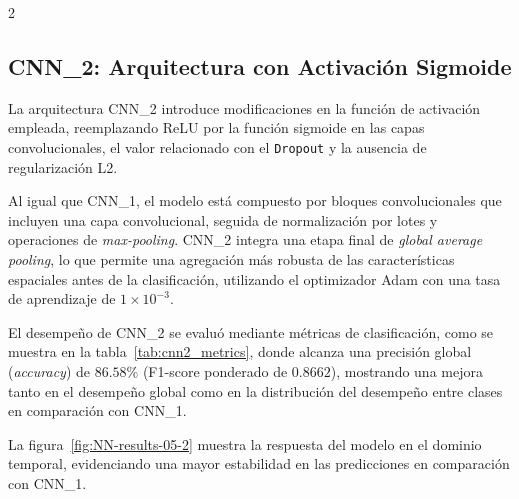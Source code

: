 \documentclass[12pt]{report}
\newenvironment{tightmulticols}{%
  \begin{multicols}{2}
  \setlength{\parskip}{1.2pt}
  \linespread{1}\selectfont
}{%
  \end{multicols}
}
\begin{document}
\begin{tightmulticols}

\subsection{CNN\_2: Arquitectura con Activación Sigmoide}

\noindent La arquitectura CNN\_2 introduce modificaciones en la función de activación empleada, reemplazando ReLU por la función sigmoide en las capas convolucionales, el valor relacionado con el \texttt{Dropout} y la ausencia de regularización L2.

\par Al igual que CNN\_1, el modelo está compuesto por bloques convolucionales que incluyen una capa convolucional, seguida de normalización por lotes y operaciones de \textit{max-pooling}. CNN\_2 integra una etapa final de \textit{global average pooling}, lo que permite una agregación más robusta de las características espaciales antes de la clasificación, utilizando el optimizador Adam con una tasa de aprendizaje de $1 \times 10^{-3}$.

\par El desempeño de CNN\_2 se evaluó mediante métricas de clasificación, como se muestra en la tabla~\ref{tab:cnn2_metrics}, donde alcanza una precisión global (\textit{accuracy}) de $86.58\%$ (F1-score ponderado de $0.8662$), mostrando una mejora tanto en el desempeño global como en la distribución del desempeño entre clases en comparación con CNN\_1.

\par La figura~\ref{fig:NN-results-05-2} muestra la respuesta del modelo en el dominio temporal, evidenciando una mayor estabilidad en las predicciones en comparación con CNN\_1.

\end{tightmulticols}
\end{document}
